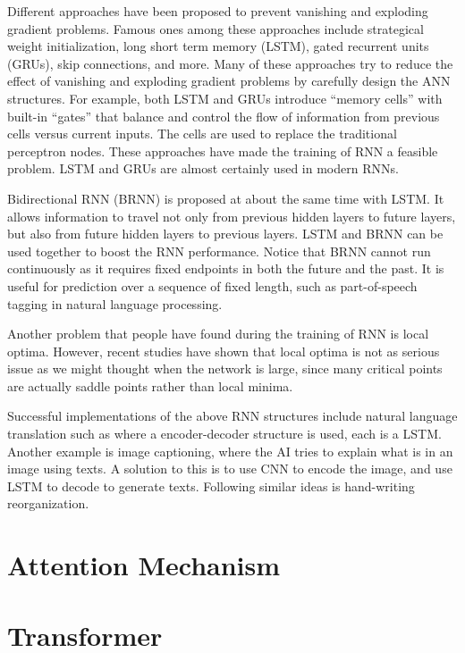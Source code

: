 Different approaches have been proposed to prevent vanishing and exploding gradient problems. Famous ones among these approaches include strategical weight initialization, long short term memory (LSTM), gated recurrent units (GRUs), skip connections, and more. Many of these approaches try to reduce the effect of vanishing and exploding gradient problems by carefully design the ANN structures. For example, both LSTM and GRUs introduce ``memory cells'' with built-in ``gates'' that balance and control the flow of information from previous cells versus current inputs. The cells are used to replace the traditional perceptron nodes. These approaches have made the training of RNN a feasible problem. LSTM and GRUs are almost certainly used in modern RNNs.

Bidirectional RNN (BRNN) is proposed at about the same time with LSTM. It allows information to travel not only from previous hidden layers to future layers, but also from future hidden layers to previous layers. LSTM and BRNN can be used together to boost the RNN performance. Notice that BRNN cannot run continuously as it requires fixed endpoints in both the future and the past. It is useful for prediction over a sequence of fixed length, such as part-of-speech tagging in natural language processing.

Another problem that people have found during the training of RNN is local optima. However, recent studies have shown that local optima is not as serious issue as we might thought when the network is large, since many critical points are actually saddle points rather than local minima.

Successful implementations of the above RNN structures include natural language translation such as \cite{sutskever2014sequence} where a encoder-decoder structure is used, each is a LSTM. Another example is image captioning, where the AI tries to explain what is in an image using texts. A solution to this is to use CNN to encode the image, and use LSTM to decode to generate texts. Following similar ideas is hand-writing reorganization.

\section{Attention Mechanism}

\section{Transformer}

